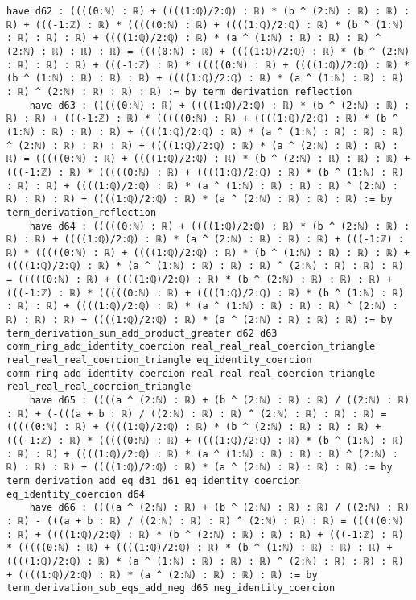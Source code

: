 \documentclass{article}
\begin{document}
\begin{tcolorbox}[colback=white!10, width=\linewidth]
\begin{lstlisting}[language=Lean4]
    have d62 : ((((0:ℕ) : ℝ) + ((((1:ℚ)/2:ℚ) : ℝ) * (b ^ (2:ℕ) : ℝ) : ℝ) : ℝ) + (((-1:ℤ) : ℝ) * (((((0:ℕ) : ℝ) + ((((1:ℚ)/2:ℚ) : ℝ) * (b ^ (1:ℕ) : ℝ) : ℝ) : ℝ) + ((((1:ℚ)/2:ℚ) : ℝ) * (a ^ (1:ℕ) : ℝ) : ℝ) : ℝ) ^ (2:ℕ) : ℝ) : ℝ) : ℝ) = ((((0:ℕ) : ℝ) + ((((1:ℚ)/2:ℚ) : ℝ) * (b ^ (2:ℕ) : ℝ) : ℝ) : ℝ) + (((-1:ℤ) : ℝ) * (((((0:ℕ) : ℝ) + ((((1:ℚ)/2:ℚ) : ℝ) * (b ^ (1:ℕ) : ℝ) : ℝ) : ℝ) + ((((1:ℚ)/2:ℚ) : ℝ) * (a ^ (1:ℕ) : ℝ) : ℝ) : ℝ) ^ (2:ℕ) : ℝ) : ℝ) : ℝ) := by term_derivation_reflection
    have d63 : (((((0:ℕ) : ℝ) + ((((1:ℚ)/2:ℚ) : ℝ) * (b ^ (2:ℕ) : ℝ) : ℝ) : ℝ) + (((-1:ℤ) : ℝ) * (((((0:ℕ) : ℝ) + ((((1:ℚ)/2:ℚ) : ℝ) * (b ^ (1:ℕ) : ℝ) : ℝ) : ℝ) + ((((1:ℚ)/2:ℚ) : ℝ) * (a ^ (1:ℕ) : ℝ) : ℝ) : ℝ) ^ (2:ℕ) : ℝ) : ℝ) : ℝ) + ((((1:ℚ)/2:ℚ) : ℝ) * (a ^ (2:ℕ) : ℝ) : ℝ) : ℝ) = (((((0:ℕ) : ℝ) + ((((1:ℚ)/2:ℚ) : ℝ) * (b ^ (2:ℕ) : ℝ) : ℝ) : ℝ) + (((-1:ℤ) : ℝ) * (((((0:ℕ) : ℝ) + ((((1:ℚ)/2:ℚ) : ℝ) * (b ^ (1:ℕ) : ℝ) : ℝ) : ℝ) + ((((1:ℚ)/2:ℚ) : ℝ) * (a ^ (1:ℕ) : ℝ) : ℝ) : ℝ) ^ (2:ℕ) : ℝ) : ℝ) : ℝ) + ((((1:ℚ)/2:ℚ) : ℝ) * (a ^ (2:ℕ) : ℝ) : ℝ) : ℝ) := by term_derivation_reflection
    have d64 : (((((0:ℕ) : ℝ) + ((((1:ℚ)/2:ℚ) : ℝ) * (b ^ (2:ℕ) : ℝ) : ℝ) : ℝ) + ((((1:ℚ)/2:ℚ) : ℝ) * (a ^ (2:ℕ) : ℝ) : ℝ) : ℝ) + (((-1:ℤ) : ℝ) * (((((0:ℕ) : ℝ) + ((((1:ℚ)/2:ℚ) : ℝ) * (b ^ (1:ℕ) : ℝ) : ℝ) : ℝ) + ((((1:ℚ)/2:ℚ) : ℝ) * (a ^ (1:ℕ) : ℝ) : ℝ) : ℝ) ^ (2:ℕ) : ℝ) : ℝ) : ℝ) = (((((0:ℕ) : ℝ) + ((((1:ℚ)/2:ℚ) : ℝ) * (b ^ (2:ℕ) : ℝ) : ℝ) : ℝ) + (((-1:ℤ) : ℝ) * (((((0:ℕ) : ℝ) + ((((1:ℚ)/2:ℚ) : ℝ) * (b ^ (1:ℕ) : ℝ) : ℝ) : ℝ) + ((((1:ℚ)/2:ℚ) : ℝ) * (a ^ (1:ℕ) : ℝ) : ℝ) : ℝ) ^ (2:ℕ) : ℝ) : ℝ) : ℝ) + ((((1:ℚ)/2:ℚ) : ℝ) * (a ^ (2:ℕ) : ℝ) : ℝ) : ℝ) := by term_derivation_sum_add_product_greater d62 d63 comm_ring_add_identity_coercion real_real_real_coercion_triangle real_real_real_coercion_triangle eq_identity_coercion comm_ring_add_identity_coercion real_real_real_coercion_triangle real_real_real_coercion_triangle
    have d65 : ((((a ^ (2:ℕ) : ℝ) + (b ^ (2:ℕ) : ℝ) : ℝ) / ((2:ℕ) : ℝ) : ℝ) + (-(((a + b : ℝ) / ((2:ℕ) : ℝ) : ℝ) ^ (2:ℕ) : ℝ) : ℝ) : ℝ) = (((((0:ℕ) : ℝ) + ((((1:ℚ)/2:ℚ) : ℝ) * (b ^ (2:ℕ) : ℝ) : ℝ) : ℝ) + (((-1:ℤ) : ℝ) * (((((0:ℕ) : ℝ) + ((((1:ℚ)/2:ℚ) : ℝ) * (b ^ (1:ℕ) : ℝ) : ℝ) : ℝ) + ((((1:ℚ)/2:ℚ) : ℝ) * (a ^ (1:ℕ) : ℝ) : ℝ) : ℝ) ^ (2:ℕ) : ℝ) : ℝ) : ℝ) + ((((1:ℚ)/2:ℚ) : ℝ) * (a ^ (2:ℕ) : ℝ) : ℝ) : ℝ) := by term_derivation_add_eq d31 d61 eq_identity_coercion eq_identity_coercion d64
    have d66 : ((((a ^ (2:ℕ) : ℝ) + (b ^ (2:ℕ) : ℝ) : ℝ) / ((2:ℕ) : ℝ) : ℝ) - (((a + b : ℝ) / ((2:ℕ) : ℝ) : ℝ) ^ (2:ℕ) : ℝ) : ℝ) = (((((0:ℕ) : ℝ) + ((((1:ℚ)/2:ℚ) : ℝ) * (b ^ (2:ℕ) : ℝ) : ℝ) : ℝ) + (((-1:ℤ) : ℝ) * (((((0:ℕ) : ℝ) + ((((1:ℚ)/2:ℚ) : ℝ) * (b ^ (1:ℕ) : ℝ) : ℝ) : ℝ) + ((((1:ℚ)/2:ℚ) : ℝ) * (a ^ (1:ℕ) : ℝ) : ℝ) : ℝ) ^ (2:ℕ) : ℝ) : ℝ) : ℝ) + ((((1:ℚ)/2:ℚ) : ℝ) * (a ^ (2:ℕ) : ℝ) : ℝ) : ℝ) := by term_derivation_sub_eqs_add_neg d65 neg_identity_coercion

\end{lstlisting}
\end{tcolorbox}
\end{document}
